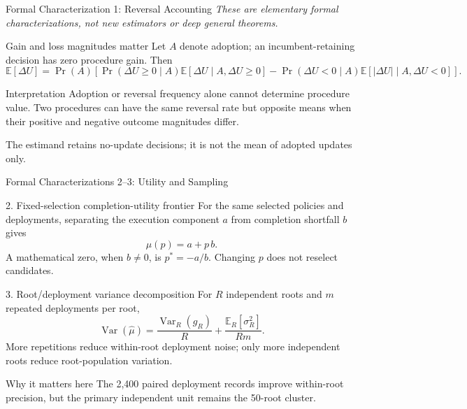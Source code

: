 \documentclass[10pt,aspectratio=169]{beamer}
\begin{document}
\begin{frame}{Formal Characterization 1: Reversal Accounting}
  \small
  \emph{These are elementary formal characterizations, not new estimators or deep general theorems.}
  \vspace{0.35em}
  \begin{block}{Gain and loss magnitudes matter}
    Let $A$ denote adoption; an incumbent-retaining decision has zero procedure gain. Then
    \[
      \mathbb{E}[\Delta U] = \Pr(A)\!\left[\Pr(\Delta U\geq0\mid A)\mathbb{E}[\Delta U\mid A,\Delta U\geq0]
      -\Pr(\Delta U<0\mid A)\mathbb{E}[|\Delta U|\mid A,\Delta U<0]\right].
    \]
  \end{block}
  \vspace{0.4em}
  \begin{alertblock}{Interpretation}
    Adoption or reversal frequency alone cannot determine procedure value. Two procedures can have the same reversal rate but opposite means when their positive and negative outcome magnitudes differ.
  \end{alertblock}
  \vfill
  \centering\scriptsize The estimand retains no-update decisions; it is not the mean of adopted updates only.
\end{frame}

\begin{frame}{Formal Characterizations 2--3: Utility and Sampling}
  \footnotesize
  \begin{block}{2. Fixed-selection completion-utility frontier}
    For the same selected policies and deployments, separating the execution component $a$ from completion shortfall $b$ gives
    \[
      \mu(p)=a+p\,b.
    \]
    A mathematical zero, when $b\neq0$, is $p^*=-a/b$. Changing $p$ does not reselect candidates.
  \end{block}
  \vspace{0.25em}
  \begin{block}{3. Root/deployment variance decomposition}
    For $R$ independent roots and $m$ repeated deployments per root,
    \[
      \operatorname{Var}(\widehat\mu)=\frac{\operatorname{Var}_R(g_R)}{R}+\frac{\mathbb{E}_R[\sigma_R^2]}{R m}.
    \]
    More repetitions reduce within-root deployment noise; only more independent roots reduce root-population variation.
  \end{block}
  \begin{alertblock}{Why it matters here}
    The 2,400 paired deployment records improve within-root precision, but the primary independent unit remains the 50-root cluster.
  \end{alertblock}
\end{frame}
\end{document}
